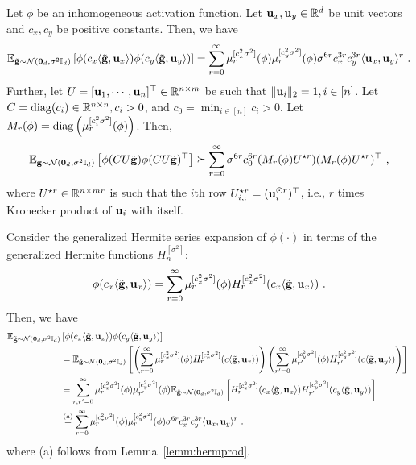 \begin{lemm}
Let $\phi$ be an inhomogeneous activation function. Let $\mathbf{u}_x, \mathbf{u}_y\in\mathbb{R}^d$ be unit vectors and $c_x, c_y$ be positive constants. Then,  we have
\begin{align}
\mathbb{E}_{\tilde{\mathbf{g}} \sim {\cal N}(\bm{0}_d,\sigma^2 \mathbb{I}_d)}\left[ \phi(c_x\langle \tilde{\mathbf{g}}, \mathbf{u}_x \rangle) \phi(c_y\langle \tilde{\mathbf{g}}, \mathbf{u}_y \rangle) \right] = \sum_{r=0}^{\infty} \mu_r^{[c_x^2 \sigma^2]}(\phi) \mu_r^{[c_y^2 \sigma^2]}(\phi) \sigma^{6r} c_x^{3r} c_y^{3r}  \langle \mathbf{u}_x, \mathbf{u}_y \rangle^r ~. 
\end{align}
Further, let $U = [\mathbf{u}_1,\cdots,\mathbf{u}_n]^\top \in \mathbb{R}^{n \times m}$ be such that $\| \mathbf{u}_i \|_2 =1, i \in [n]$. Let $C =\operatorname{diag}(c_i)\in\mathbb{R}^{n\times n}, c_i > 0$, and $c_0 = \min_{i \in [n]} c_i > 0$. Let $M_r(\phi) =  \operatorname{diag}\left( \mu_r^{[c_i^2 \sigma^2]}(\phi)\right)$. Then,
\begin{align}
\mathbb{E}_{\tilde{\mathbf{g}} \sim {\cal N}(\bm{0}_d,\sigma^2 \mathbb{I}_d)}\left[ \phi(C U \tilde{\mathbf{g}}) \phi(C U \tilde{\mathbf{g}})^\top \right] \succeq \sum_{r=0}^{\infty}  \sigma^{6r} c_0^{6r} (M_r(\phi) U^{\star r}) (M_r(\phi) U^{\star r})^\top~,
\end{align}
where $U^{\star r} \in \mathbb{R}^{n \times mr}$ is such that the $i$th row $U^{\star r}_{i,:} = (\mathbf{u}_i^{\odot r})^\top$, i.e., $r$ times Kronecker product of $\mathbf{u}_i$ with itself.
\label{lemm:hermseries}
\end{lemm}
\proof Consider the generalized Hermite series expansion of $\phi(\cdot)$ in terms of the generalized Hermite functions $H_n^{[\sigma^2]}$:
\begin{align}
\phi(c_x\langle \tilde{\mathbf{g}}, \mathbf{u}_x \rangle) = \sum_{r=0}^{\infty} \mu_r^{[c_x^2 \sigma^2]}(\phi) H_r^{[c_x^2 \sigma^2]}(c_x \langle \tilde{\mathbf{g}}, \mathbf{u}_x \rangle)~.
\end{align}
Then, we have 
\begin{align*}
\mathbb{E}_{\tilde{\mathbf{g}} \sim {\cal N}(\bm{0}_d,\sigma^2 \mathbb{I}_d)}&\left[ \phi(c_x\langle \tilde{\mathbf{g}}, \mathbf{u}_x \rangle) \phi(c_y\langle \tilde{\mathbf{g}}, \mathbf{u}_y \rangle) \right] \\
& = \mathbb{E}_{\tilde{\mathbf{g}} \sim {\cal N}(\bm{0}_d,\sigma^2 \mathbb{I}_d)}\left[ \left( \sum_{r=0}^{\infty} \mu_r^{[c_x^2 \sigma^2]}(\phi) H_r^{[c_x^2 \sigma^2]}(c\langle \tilde{\mathbf{g}}, \mathbf{u}_x \rangle) \right) \left( \sum_{r'=0}^{\infty} \mu_{r'}^{[c_y^2 \sigma^2]}(\phi) H_{r'}^{[c_y^2 \sigma^2]}(c\langle \tilde{\mathbf{g}}, \mathbf{u}_y \rangle) \right) \right] ~\\
& =  \sum_{r,r'=0}^{\infty} \mu_r^{[c_x^2 \sigma^2]}(\phi) \mu_{r'}^{[c_y^2 \sigma^2]}(\phi) \mathbb{E}_{\tilde{\mathbf{g}} \sim {\cal N}(\bm{0}_d,\sigma^2 \mathbb{I}_d)}\left[H_r^{[c_x^2 \sigma^2]}(c_x \langle \tilde{\mathbf{g}}, \mathbf{u}_x \rangle) H_{r'}^{[c_y^2 \sigma^2]}(c_y \langle \tilde{\mathbf{g}}, \mathbf{u}_y \rangle) \right] \\
& \overset{(a)}{=} \sum_{r=0}^{\infty} \mu_r^{[c_x^2 \sigma^2]}(\phi) \mu_r^{[c_y^2 \sigma^2]}(\phi)  \sigma^{6r} c_x^{3r} c_y^{3r} \langle \mathbf{u}_x, \mathbf{u}_y \rangle^r~.
\end{align*}
where (a) follows from Lemma~\ref{lemm:hermprod}. 

